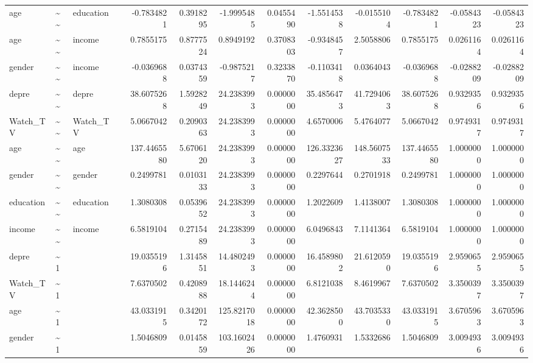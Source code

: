 \documentclass[
]{article}
\begin{document}
\begin{table}[!h]
\begin{tabular}[t]{llllrrrrrrrrr}
age & \textasciitilde{}\textasciitilde{} & education &  & -0.7834821 & 0.3918295 & -1.9995485 & 0.0455490 & -1.5514538 & -0.0155104 & -0.7834821 & -0.0584323 & -0.0584323\\
age & \textasciitilde{}\textasciitilde{} & income &  & 0.7855175 & 0.8777524 & 0.8949192 & 0.3708303 & -0.9348457 & 2.5058806 & 0.7855175 & 0.0261164 & 0.0261164\\
gender & \textasciitilde{}\textasciitilde{} & income &  & -0.0369688 & 0.0374359 & -0.9875217 & 0.3233870 & -0.1103418 & 0.0364043 & -0.0369688 & -0.0288209 & -0.0288209\\
\addlinespace
depre & \textasciitilde{}\textasciitilde{} & depre &  & 38.6075268 & 1.5928249 & 24.2383993 & 0.0000000 & 35.4856473 & 41.7294063 & 38.6075268 & 0.9329356 & 0.9329356\\
Watch\_TV & \textasciitilde{}\textasciitilde{} & Watch\_TV &  & 5.0667042 & 0.2090363 & 24.2383993 & 0.0000000 & 4.6570006 & 5.4764077 & 5.0667042 & 0.9749317 & 0.9749317\\
age & \textasciitilde{}\textasciitilde{} & age &  & 137.4465580 & 5.6706120 & 24.2383993 & 0.0000000 & 126.3323627 & 148.5607533 & 137.4465580 & 1.0000000 & 1.0000000\\
gender & \textasciitilde{}\textasciitilde{} & gender &  & 0.2499781 & 0.0103133 & 24.2383993 & 0.0000000 & 0.2297644 & 0.2701918 & 0.2499781 & 1.0000000 & 1.0000000\\
education & \textasciitilde{}\textasciitilde{} & education &  & 1.3080308 & 0.0539652 & 24.2383993 & 0.0000000 & 1.2022609 & 1.4138007 & 1.3080308 & 1.0000000 & 1.0000000\\
\addlinespace
income & \textasciitilde{}\textasciitilde{} & income &  & 6.5819104 & 0.2715489 & 24.2383993 & 0.0000000 & 6.0496843 & 7.1141364 & 6.5819104 & 1.0000000 & 1.0000000\\
depre & \textasciitilde{}1 &  &  & 19.0355196 & 1.3145851 & 14.4802493 & 0.0000000 & 16.4589802 & 21.6120590 & 19.0355196 & 2.9590655 & 2.9590655\\
Watch\_TV & \textasciitilde{}1 &  &  & 7.6370502 & 0.4208988 & 18.1446244 & 0.0000000 & 6.8121038 & 8.4619967 & 7.6370502 & 3.3500397 & 3.3500397\\
age & \textasciitilde{}1 &  &  & 43.0331915 & 0.3420172 & 125.8217018 & 0.0000000 & 42.3628500 & 43.7035330 & 43.0331915 & 3.6705963 & 3.6705963\\
gender & \textasciitilde{}1 &  &  & 1.5046809 & 0.0145859 & 103.1602426 & 0.0000000 & 1.4760931 & 1.5332686 & 1.5046809 & 3.0094936 & 3.0094936\\

\end{tabular}
\end{table}
\end{document}
